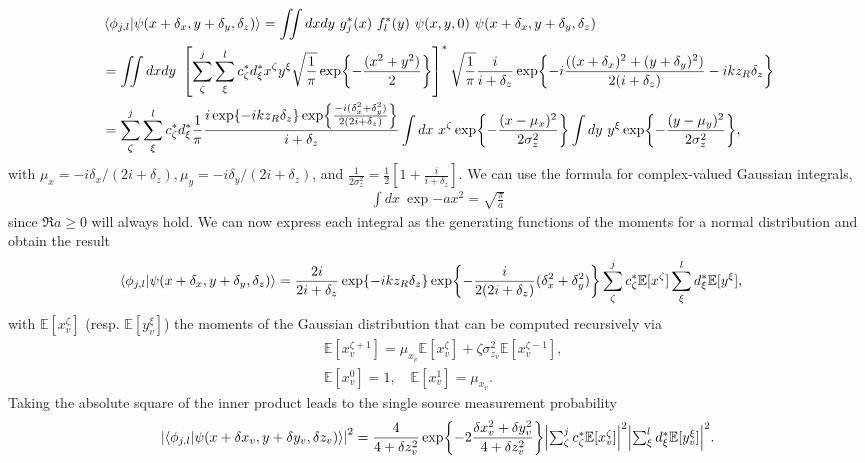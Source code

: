 \documentclass[reprint,amsmath,amssymb,aps,prl,floatfix,groupedaddress,superscriptaddress]{revtex4-2}
\begin{document}
\begin{align}
    &\braket{\phi_{j,l}}{\psi(x+\delta_x,y+\delta_y,\delta_z)} = \iint dxdy \  g^*_j(x) \ f^*_l(y) \ \psi(x,y,0) \ \psi(x+\delta_x,y+\delta_y,\delta_z) \nonumber \\
     &= \iint dxdy \ \left [  \sum_\zeta^j \sum_\xi^l c^*_\zeta d^*_\xi x^\zeta y^\xi \sqrt{\frac{1}{\pi}} \exp{-\frac{(x^2 + y^2)}{2}} \right ]^* \sqrt{\frac{1}{\pi}} \frac{i}{i + \delta_z}\exp{-i\frac{((x+\delta_x)^2 + (y+\delta_y)^2)}{2(i+\delta_z)} - i k z_R \delta_z} \nonumber \\
     &= \sum_\zeta^j  \sum_\xi^l c_\zeta^*  d_\xi^* \frac{1}{\pi} \frac{i \exp{-ikz_R \delta_z} \exp{\frac{-i( \delta_x^2 + \delta_y^2)}{2(2i+\delta_z)}}}{i+\delta_z} \int dx \ x^\zeta \exp{-\frac{(x - \mu_x)^2}{2\sigma_z^2}} \int dy \ y^\xi \exp{-\frac{(y - \mu_y)^2}{2\sigma_z^2}},
\end{align}
with $\mu_x = -i\delta_x / (2i + \delta_z), \mu_y = -i\delta_y / (2i + \delta_z)$, and $\frac{1}{2\sigma_z^2} = \frac{1}{2} [ 1 + \frac{i}{i + \delta_z}]$. We can use the formula for complex-valued Gaussian integrals,
\begin{align}
    \int dx \ \exp{-ax^2} = \sqrt{\frac{\pi}{a}}
\end{align}
since $\Re{a} \geq 0$ will always hold. We can now express each integral as the generating functions of the moments for a normal distribution and obtain the result
\begin{align}
   \braket{\phi_{j,l}}{\psi(x+\delta_x,y+\delta_y,\delta_z)} &= \frac{2i}{2i + \delta_z}  \exp{-ikz_R\delta_z} \exp{-\frac{i}{2(2i +\delta_z)}(\delta_x^2 + \delta_y^2)} \sum_\zeta^j c^*_\zeta \mathbb{E}[x^\zeta]\sum_\xi^l d^*_\xi \mathbb{E}[y^\xi],
\end{align}
with $\mathbb{E}[x_v^\zeta]$ (resp. $\mathbb{E}[y_v^\xi]$) the moments of the Gaussian distribution that can be computed recursively via
\begin{align}
    \label{def:recursive_moments}
    &\mathbb{E}[x_v^{\zeta+1}] = \mu_{x_v} \mathbb{E}[x_v^\zeta] + \zeta \sigma_{z_v}^2 \mathbb{E}[x_v^{\zeta-1}], \\
    &\mathbb{E}[x_v^0] = 1,  \quad \mathbb{E}[x_v^1] = \mu_{x_v} \nonumber.
\end{align}
Taking the absolute square of the inner product leads to the single source measurement probability
\begin{align}
\label{eq:three_sources_incoherent_ms_prob}
    \abs{\braket{\phi_{j,l}}{\psi(x + \delta x_v, y + \delta y_v, \delta z_v)}}^2 = \frac{4}{4 + \delta z_v^2} \exp{-2 \frac{\delta x_v^2 + \delta y_v^2}{4+\delta z_v^2}} \mbox{$\abs{\sum_\zeta^j c^*_\zeta \mathbb{E}[x_v^\zeta]}^2$} \mbox{$\abs{\sum_\xi^l d^*_\xi \mathbb{E}[y_v^\xi]}^2$}.
\end{align}
\end{document}
